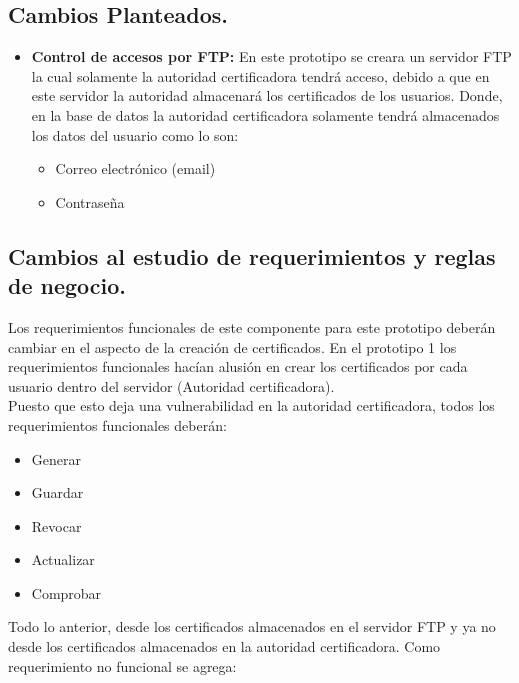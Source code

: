 \documentclass[12pt, a4paper, titlepage]{report}
\begin{document}
            \subsection{Cambios Planteados.}
                \begin{itemize}
                    \item \textbf{Control de accesos por FTP: } En este prototipo se creara un servidor FTP la cual solamente la autoridad certificadora tendrá acceso, debido a que en este servidor la autoridad almacenará los certificados de los usuarios. Donde, en la base de datos la autoridad certificadora solamente tendrá almacenados los datos del usuario como lo son: 
                    \begin{itemize}
                        \item Correo electrónico (email)
                        \item Contraseña
                    \end{itemize}
                \end{itemize}
                
            
            \subsection{Cambios al estudio de requerimientos y reglas de negocio.}
            
            Los requerimientos funcionales de este componente para este prototipo deberán cambiar en el aspecto de la creación de certificados. En el prototipo 1 los requerimientos funcionales hacían alusión en crear los certificados por cada usuario dentro del servidor (Autoridad certificadora). \\
            Puesto que esto deja una vulnerabilidad en la autoridad certificadora, todos los requerimientos funcionales deberán: 
            \begin{itemize}
                \item Generar
                \item Guardar
                \item Revocar
                \item Actualizar
                \item Comprobar
            \end{itemize}
            Todo lo anterior, desde los certificados almacenados en el servidor FTP y ya no desde los certificados almacenados en la autoridad certificadora.
            Como requerimiento no funcional se agrega:\\
            
\end{document}
